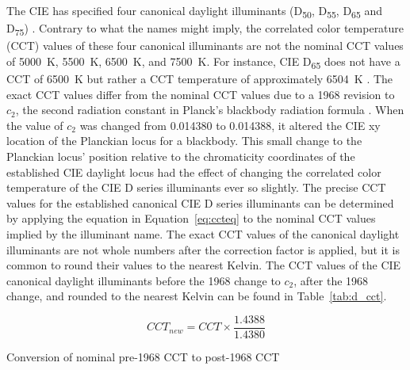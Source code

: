 The CIE has specified four canonical daylight illuminants (D\textsubscript{50}, D\textsubscript{55}, D\textsubscript{65} and D\textsubscript{75}) \cite{CIE152004}.  Contrary to what the names might imply, the correlated color temperature (CCT) values of these four canonical illuminants are not the nominal CCT values of \SI[mode=text]{5000}{\kelvin}, \SI[mode=text]{5500}{\kelvin}, \SI[mode=text]{6500}{\kelvin}, and \SI[mode=text]{7500}{\kelvin}.  For instance, CIE D\textsubscript{65} does not have a CCT of \SI[mode=text]{6500}{\kelvin} but rather a CCT temperature of approximately \SI[mode=text]{6504}{\kelvin} \cite{wyszecki1982color}.  
The exact CCT values differ from the nominal CCT values due to a 1968 revision to $c_2$, the second radiation constant in Planck's blackbody radiation formula \cite{Durieux1970}.  When the value of $c_2$ was changed from 0.014380 to 0.014388, it altered the CIE xy location of the Planckian locus for a blackbody. This small change to the Planckian locus' position relative to the chromaticity coordinates of the established CIE daylight locus had the effect of changing the correlated color temperature of the CIE D series illuminants ever so slightly.  The precise CCT values for the established canonical CIE D series illuminants can be determined by applying the equation in Equation~\ref{eq:ccteq} to the nominal CCT values implied by the illuminant name.  The exact CCT values of the canonical daylight illuminants are not whole numbers after the correction factor is applied, but it is common to round their values to the nearest Kelvin.  The CCT values of the CIE canonical daylight illuminants before the 1968 change to $c_2$, after the 1968 change, and rounded to the nearest Kelvin can be found in Table~\ref{tab:d_cct}. 

\begin{floatequ}[!ht]
\begin{equation}
    CCT_{new} = CCT\times \frac{1.4388}{1.4380}
\end{equation}
    \captionsetup{width=.75\textwidth}
    \caption{Conversion of nominal pre-1968 CCT to post-1968 CCT}
    \label{eq:ccteq}
\end{floatequ}

